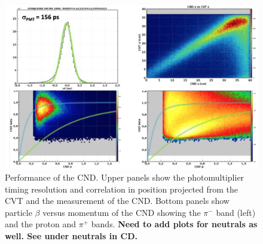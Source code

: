 \documentclass[final,3p,times,twocolumn,authoryear]{elsarticle}
\begin{document}
\begin{figure}[htbp!]
\centerline{\includegraphics[width=1.0\columnwidth]{cnd-performance.png}}
\caption{Performance of the CND. Upper panels show the photomultiplier timing resolution and correlation in position projected from the CVT and the measurement of the CND. Bottom panels show particle $\beta$ versus momentum of the CND showing the $\pi^-$ band (left) and the proton and $\pi^+$ bands. {\bf Need to add plots for neutrals as well. See under neutrals in CD.}   }
\label{cnd-performance}
\end{figure}
\end{document}
